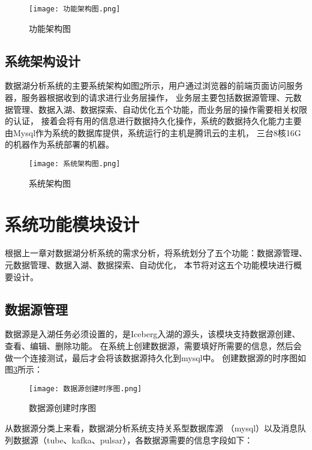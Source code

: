 \begin{figure}[H]
  \centering
  \texttt{[image: 功能架构图.png]}
  \caption{功能架构图}
  \label{fig:功能架构图}
\end{figure}

\subsection{系统架构设计}

数据湖分析系统的主要系统架构如图\ref{fig:系统架构图}所示，用户通过浏览器的前端页面访问服务器，服务器根据收到的请求进行业务层操作，
业务层主要包括数据源管理、元数据管理、数据入湖、数据探索、自动优化五个功能，而业务层的操作需要相关权限的认证，
接着会将有用的信息进行数据持久化操作，系统的数据持久化能力主要由Mysql作为系统的数据库提供，系统运行的主机是腾讯云的主机，
三台8核16G的机器作为系统部署的机器。

\begin{figure}[H]
  \centering
  \texttt{[image: 系统架构图.png]}
  \caption{系统架构图}
  \label{fig:系统架构图}
\end{figure}

\section{系统功能模块设计}

根据上一章对数据湖分析系统的需求分析，将系统划分了五个功能：数据源管理、元数据管理、数据入湖、数据探索、自动优化，
本节将对这五个功能模块进行概要设计。

\subsection{数据源管理}

数据源是入湖任务必须设置的，是Iceberg入湖的源头，该模块支持数据源创建、查看、编辑、删除功能。
在系统上创建数据源，需要填好所需要的信息，然后会做一个连接测试，最后才会将该数据源持久化到mysql中。
创建数据源的时序图如图\ref{fig:数据源创建时序图}所示：

\begin{figure}[H]
  \centering
  \texttt{[image: 数据源创建时序图.png]}
  \caption{数据源创建时序图}
  \label{fig:数据源创建时序图}
\end{figure}

从数据源分类上来看，数据湖分析系统支持关系型数据库源
（mysql）以及消息队列数据源（tube、kafka、pulsar），各数据源需要的信息字段如下：

